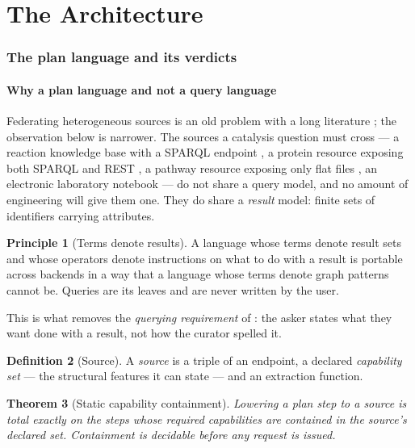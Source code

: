 \documentclass[11pt,twocolumn,a4paper]{article}
\theoremstyle{thmstyle}
\newtheorem{theorem}{Theorem}[section]
\theoremstyle{definition}
\newtheorem{definition}[theorem]{Definition}
\newtheorem{principle}[theorem]{Principle}
\theoremstyle{remark}
\begin{document}
\part{The Architecture}

\section{The plan language and its verdicts}
\label{sec:plan}

\subsection{Why a plan language and not a query language}

Federating heterogeneous sources is an old problem with a long literature
\citep{halevy2006pdms,buil2013federated}; the observation below is narrower.
The sources a catalysis question must cross --- a reaction knowledge base with
a SPARQL endpoint \citep{bansal2022}, a protein resource exposing both SPARQL
and REST \citep{uniprot2023}, a pathway resource exposing only flat files
\citep{kanehisa2000,milacic2024}, an electronic laboratory notebook ---
do not share a query model, and no amount of engineering will give them one.
They do share a \emph{result} model: finite sets of identifiers carrying
attributes.

\begin{principle}[Terms denote results]
\label{prin:results}
A language whose terms denote result sets and whose operators denote
instructions on what to do with a result is portable across backends in a way
that a language whose terms denote graph patterns cannot be. Queries are its
leaves and are never written by the user.
\end{principle}

This is what removes the \emph{querying requirement} of : the
asker states what they want done with a result, not how the curator spelled
it.

\begin{definition}[Source]
\label{def:source}
A \emph{source} is a triple of an endpoint, a declared \emph{capability set}
--- the structural features it can state --- and an extraction function.
\end{definition}

\begin{theorem}[Static capability containment]
\label{thm:static}
Lowering a plan step to a source is total exactly on the steps whose required
capabilities are contained in the source's declared set. Containment is
decidable before any request is issued.
\end{theorem}
\end{document}
